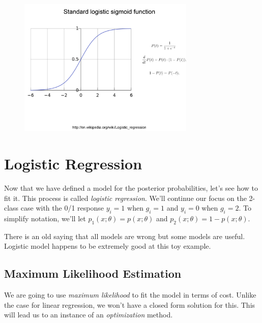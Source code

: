 \documentclass[a4paper]{article}
\begin{document}
\begin{figure}
\centering
\includegraphics[width=0.75\textwidth]{sigmoid.png}
\end{figure}


\section{Logistic Regression}

Now that we have defined a model for the posterior probabilities, let's see how to fit it. This process is called \emph{logistic regression}.  We'll continue our focus on the 2-class case with the 0/1 response 
$y_i=1$ when $g_i=1$ and 
$y_i=0$ when $g_i=2$.  
To simplify notation, we'll let 
$p_1(x;\theta)=p(x;\theta)$ and 
$p_2(x;\theta)=1-p(x;\theta)$.

There is an old saying that all models are wrong but some models are useful. Logistic model happens to be extremely good at this toy example.

\subsection{Maximum Likelihood Estimation}
We are going to use \emph{maximum likelihood} to fit the model in terms of cost.  Unlike the case for linear regression, we won't have a closed form solution for this.  This will lead us to an instance of an \emph{optimization} method.
\end{document}
